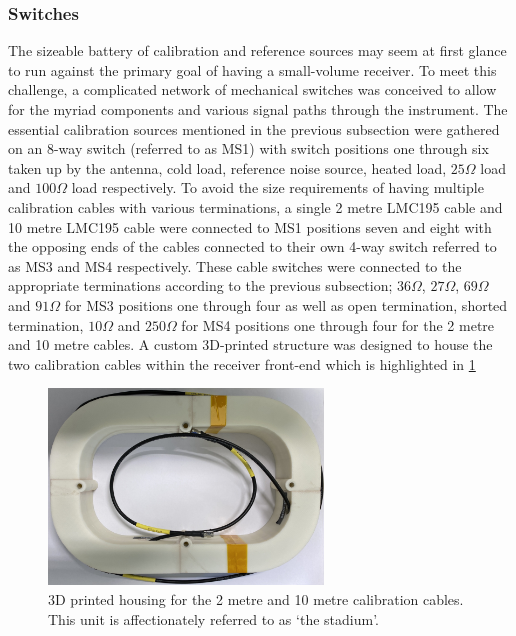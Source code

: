 \subsubsection{Switches}
The sizeable battery of calibration and reference sources may seem at first glance to run against the primary goal of having a small-volume receiver. To meet this challenge, a complicated network of mechanical switches was conceived to allow for the myriad components and various signal paths through the instrument. The essential calibration sources mentioned in the previous subsection were gathered on an 8-way switch (referred to as MS1) with switch positions one through six taken up by the antenna, cold load, reference noise source, heated load, $25 \Omega$ load and $100 \Omega$ load respectively. To avoid the size requirements of having multiple calibration cables with various terminations, a single 2 metre LMC195 cable and 10 metre LMC195 cable were connected to MS1 positions seven and eight with the opposing ends of the cables connected to their own 4-way switch referred to as MS3 and MS4 respectively. These cable switches were connected to the appropriate terminations according to the previous subsection; $36 \Omega$, $27 \Omega$, $69 \Omega$ and $91 \Omega$ for MS3 positions one through four as well as open termination, shorted termination, $10 \Omega$ and $250 \Omega$ for MS4 positions one through four for the 2 metre and 10 metre cables. A custom 3D-printed structure was designed to house the two calibration cables within the receiver front-end which is highlighted in \cref{fig:stadium}
\begin{figure}
    \centering
    \includegraphics[width=0.65\textwidth]{stadium}
    \caption{3D printed housing for the 2 metre and 10 metre calibration cables. This unit is affectionately referred to as ‘the stadium’.}
    \label{fig:stadium}
\end{figure}

